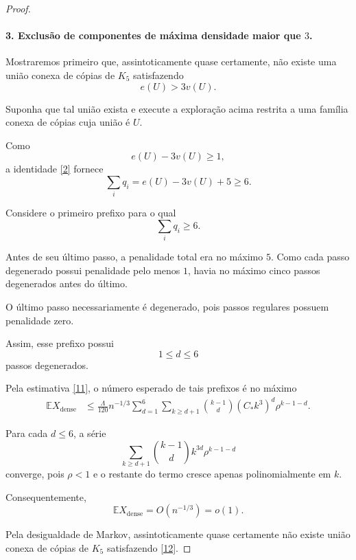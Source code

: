 \documentclass[reqno, 12pt]{amsart}
\numberwithin{equation}{section}
\theoremstyle{plain}
\theoremstyle{definition}
\begin{document}
\begin{proof}
  \paragraph{3. Exclusão de componentes de máxima densidade maior que $3$.}

  Mostraremos primeiro que, assintoticamente quase certamente, não
  existe uma união conexa de cópias de $K_5$ satisfazendo
  \[
    e(U)>3v(U).
    \tag{12}\label{12}
  \]

  Suponha que tal união exista e execute a exploração acima restrita a
  uma família conexa de cópias cuja união é $U$.

  Como
  \[
    e(U)-3v(U)\ge1,
  \]
  a identidade \eqref{2} fornece
  \[
    \sum_iq_i
    =
    e(U)-3v(U)+5
    \ge6.
    \tag{13}\label{13}
  \]

  Considere o primeiro prefixo para o qual
  \[
    \sum_iq_i\ge6.
  \]

  Antes de seu último passo, a penalidade total era no máximo $5$.
  Como cada passo degenerado possui penalidade pelo menos $1$, havia no
  máximo cinco passos degenerados antes do último.

  O último passo necessariamente é degenerado, pois passos regulares
  possuem penalidade zero.

  Assim, esse prefixo possui
  \[
    1\le d\le6
    \tag{14}\label{14}
  \]
  passos degenerados.

  Pela estimativa \eqref{11}, o número esperado de tais prefixos é no
  máximo
  \[
    \begin{aligned}
      \mathbb E X_{\mathrm{dense}}
       & \le
      \frac{\Lambda}{120}n^{-1/3}
      \sum_{d=1}^{6}
      \sum_{k\ge d+1}
      \binom{k-1}{d}
      (C_*k^3)^d
      \rho^{k-1-d}.
    \end{aligned}
    \tag{15}\label{15}
  \]

  Para cada $d\le6$, a série
  \[
    \sum_{k\ge d+1}
    \binom{k-1}{d}
    k^{3d}
    \rho^{k-1-d}
  \]
  converge, pois $\rho<1$ e o restante do termo cresce apenas
  polinomialmente em $k$.

  Consequentemente,
  \[
    \mathbb E X_{\mathrm{dense}}
    =
    O(n^{-1/3})
    =
    o(1).
    \tag{16}\label{16}
  \]

  Pela desigualdade de Markov, assintoticamente quase certamente não
  existe união conexa de cópias de $K_5$ satisfazendo \eqref{12}.


\end{proof}
\end{document}
